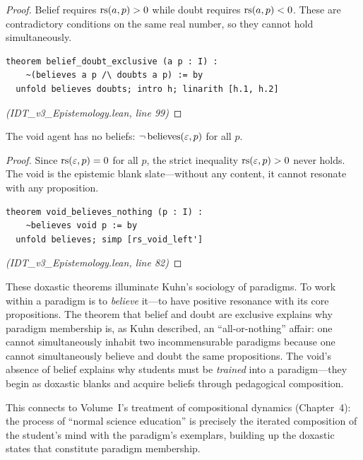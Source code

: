 \begin{proof}
Belief requires $\mathrm{rs}(a, p) > 0$ while doubt requires $\mathrm{rs}(a, p) < 0$. These
are contradictory conditions on the same real number, so they cannot hold
simultaneously.
\begin{lstlisting}
theorem belief_doubt_exclusive (a p : I) :
    ~(believes a p /\ doubts a p) := by
  unfold believes doubts; intro h; linarith [h.1, h.2]
\end{lstlisting}
\textit{(IDT\_v3\_Epistemology.lean, line 99)}
\end{proof}

\begin{theorem}
\label{thm:void-believes-nothing}
The void agent has no beliefs: $\neg\,\mathrm{believes}(\varepsilon, p)$ for all $p$.
\end{theorem}

\begin{proof}
Since $\mathrm{rs}(\varepsilon, p) = 0$ for all $p$, the strict inequality $\mathrm{rs}(\varepsilon, p) > 0$
never holds. The void is the epistemic blank slate---without any content, it
cannot resonate with any proposition.
\begin{lstlisting}
theorem void_believes_nothing (p : I) :
    ~believes void p := by
  unfold believes; simp [rs_void_left']
\end{lstlisting}
\textit{(IDT\_v3\_Epistemology.lean, line 82)}
\end{proof}

\begin{interpretation}
These doxastic theorems illuminate Kuhn's sociology of paradigms. To work within
a paradigm is to \emph{believe} it---to have positive resonance with its core
propositions. The theorem that belief and doubt are exclusive explains why
paradigm membership is, as Kuhn described, an ``all-or-nothing'' affair: one
cannot simultaneously inhabit two incommensurable paradigms because one cannot
simultaneously believe and doubt the same propositions. The void's absence of
belief explains why students must be \emph{trained} into a paradigm---they begin
as doxastic blanks and acquire beliefs through pedagogical composition.

This connects to Volume~I's treatment of compositional dynamics (Chapter~4): the
process of ``normal science education'' is precisely the iterated composition of
the student's mind with the paradigm's exemplars, building up the doxastic
states that constitute paradigm membership.
\end{interpretation}


